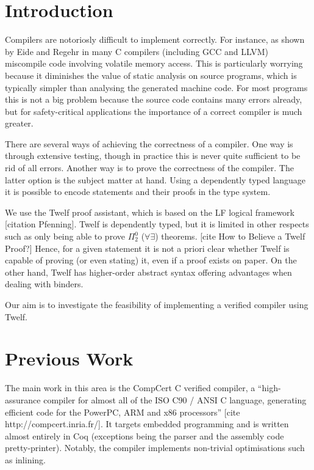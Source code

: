 \section{Introduction}
Compilers are notoriosly difficult to implement correctly.
For instance, as shown by Eide and Regehr in \cite{EideRegehr08} many C compilers (including GCC and LLVM) miscompile code involving volatile memory access.
This is particularly worrying because it diminishes the value of static analysis on source programs, which is typically simpler than analysing the generated machine code.
For most programs this is not a big problem because the source code contains many errors already, but for safety-critical applications the importance of a correct compiler is much greater.


There are several ways of achieving the correctness of a compiler.
One way is through extensive testing, though in practice this is never quite sufficient to be rid of all errors.
Another way is to prove the correctness of the compiler.
The latter option is the subject matter at hand.
Using a dependently typed language it is possible to encode statements and their proofs in the type system.

We use the Twelf proof assistant, which is based on the LF logical framework [citation Pfenning].
Twelf is dependently typed, but it is limited in other respects such as only being able to prove $\Pi_2^0$ ($\forall \exists$) theorems. [cite How to Believe a Twelf Proof?]
Hence, for a given statement it is not a priori clear whether Twelf is capable of proving (or even stating) it, even if a proof exists on paper.
On the other hand, Twelf has higher-order abstract syntax offering advantages when dealing with binders.

Our aim is to investigate the feasibility of implementing a verified compiler using Twelf.


\section{Previous Work}

The main work in this area is the CompCert C verified compiler, a ``high-assurance compiler for almost all of the ISO C90 / ANSI C language, generating efficient code for the PowerPC, ARM and x86 processors'' [cite http://compcert.inria.fr/].
It targets embedded programming and is written almost entirely in Coq (exceptions being the parser and the assembly code pretty-printer).
Notably, the compiler implements non-trivial optimisations such as inlining.

